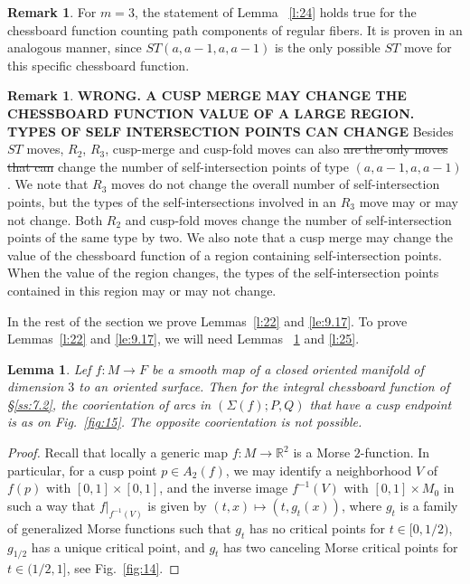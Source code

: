 \documentclass[12pt]{amsart}
\def \R{\mathbb{R}}
\def\co{\colon}
\newtheorem{lemma}[theorem]{Lemma}
\theoremstyle{definition}
\newtheorem{remark}[theorem]{Remark}
\begin{document}
{\begin{remark}
For $m=3$, the statement of Lemma ~\ref{l:24} holds true for the chessboard function counting path components of regular fibers.  It is proven in an analogous manner, since $ST(a,a-1,a,a-1)$ is the only possible $ST$ move for this specific chessboard function. 
\end{remark}


\begin{remark} {\color{red} \bf WRONG. A CUSP MERGE MAY CHANGE THE CHESSBOARD FUNCTION VALUE OF A LARGE REGION. TYPES OF SELF INTERSECTION POINTS CAN CHANGE} Besides $ST$ moves,  $R_2$, $R_3$, {\color{red} cusp-merge and cusp-fold moves can also} \sout{are the only moves that can} change the number of self-intersection points of type $(a,a-1,a,a-1)$. We note that $R_3$ moves do not change the overall number of self-intersection points, but the types of the self-intersections involved in an $R_3$ move may or may not change.  Both $R_2$ and cusp-fold moves change the number of self-intersection points of the same type by two.  {\color{red} We also note that a cusp merge may change the value of the chessboard function of a region containing self-intersection points. When the value of the region changes, the types of the self-intersection points contained in this region may or may not change.}
\end{remark}

\fi

In the rest of the section we prove  Lemmas~\ref{l:22} and \ref{le:9.17}.  To prove Lemmas~\ref{l:22} and \ref{le:9.17}, we will need Lemmas~ \ref{l:23} and \ref{l:25}.  


 
\begin{lemma} \label{l:23} Lef $f\co M\to F$ be a smooth map of a closed oriented manifold of dimension $3$ to an oriented surface. Then for the integral chessboard function of \S\ref{ss:7.2}, 
 the coorientation of arcs in $(\Sigma(f);P,Q)$ that have a cusp endpoint is as on Fig.~\ref{fig:15}. The opposite coorientation is not possible. 
\end{lemma} 
\begin{proof}
Recall that locally a generic map $f\co M \rightarrow \R^2$ is a Morse $2$-function. In particular, for a cusp point $p \in A_2(f)$, we may identify a neighborhood $V$ of $f(p)$ with $[0,1]\times [0,1]$, and  the inverse image $f^{-1}(V)$ with $[0,1]\times M_0$ in such a way that $f|_{f^{-1}(V)}$ is given by $(t, x)\mapsto (t, g_t(x))$, where $g_t$ is a family of generalized Morse functions such that $g_t$ has no critical points for $t\in [0, 1/2)$, $g_{1/2}$ has a unique critical point, and $g_t$ has two canceling Morse critical points for $t\in (1/2, 1]$, see Fig.~\ref{fig:14}. 
 

\end{proof}}
\end{document}
